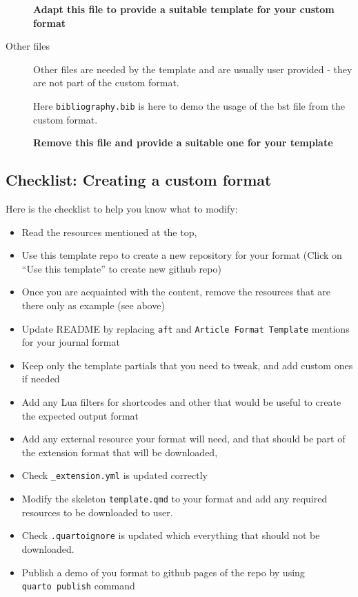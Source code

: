 \documentclass[
]{aft}
\providecommand{\tightlist}{%
  \setlength{\itemsep}{0pt}\setlength{\parskip}{0pt}}\usepackage{longtable,booktabs,array}
\begin{document}
\begin{description}
\textbf{Adapt this file to provide a suitable template for your custom
format}
\item[Other files]
Other files are needed by the template and are usually user provided -
they are not part of the custom format.

Here \texttt{bibliography.bib} is here to demo the usage of the bst file
from the custom format.

\textbf{Remove this file and provide a suitable one for your template}
\end{description}

\newpage{}

\hypertarget{checklist-creating-a-custom-format}{%
\subsection{Checklist: Creating a custom
format}\label{checklist-creating-a-custom-format}}

Here is the checklist to help you know what to modify:

\begin{itemize}
\tightlist
\item
  Read the resources mentioned at the top,
\item
  Use this template repo to create a new repository for your format
  (Click on ``Use this template'' to create new github repo)
\item
  Once you are acquainted with the content, remove the resources that
  are there only as example (see above)
\item
  Update README by replacing \texttt{aft} and
  \texttt{Article\ Format\ Template} mentions for your journal format
\item
  Keep only the template partials that you need to tweak, and add custom
  ones if needed
\item
  Add any Lua filters for shortcodes and other that would be useful to
  create the expected output format
\item
  Add any external resource your format will need, and that should be
  part of the extension format that will be downloaded,
\item
  Check \texttt{\_extension.yml} is updated correctly
\item
  Modify the skeleton \texttt{template.qmd} to your format and add any
  required resources to be downloaded to user.
\item
  Check \texttt{.quartoignore} is updated which everything that should
  not be downloaded.
\item
  Publish a demo of you format to github pages of the repo by using
  \texttt{quarto\ publish} command
\end{itemize}
\end{document}
